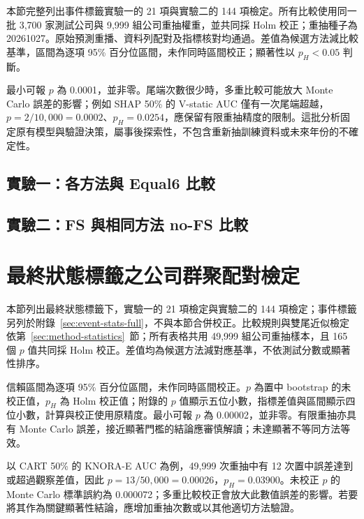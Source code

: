 本節完整列出事件標籤實驗一的 21 項與實驗二的 144 項檢定。所有比較使用同一批 3,700 家測試公司與 9,999 組公司重抽權重，並共同採 Holm 校正；重抽種子為 20261027。原始預測重播、資料列配對及指標核對均通過。差值為候選方法減比較基準，區間為逐項 95\% 百分位區間，未作同時區間校正；顯著性以 \(p_H<0.05\) 判斷。

最小可報 \(p\) 為 0.0001，並非零。尾端次數很少時，多重比較可能放大 Monte Carlo 誤差的影響；例如 SHAP 50\% 的 V-static AUC 僅有一次尾端超越，\(p=2/10{,}000=0.0002\)、\(p_H=0.0254\)，應保留有限重抽精度的限制。這批分析固定原有模型與驗證決策，屬事後探索性，不包含重新抽訓練資料或未來年份的不確定性。

\subsection*{實驗一：各方法與 Equal6 比較}


\subsection*{實驗二：FS 與相同方法 no-FS 比較}




\clearpage
\section{最終狀態標籤之公司群聚配對檢定}\label{sec:stats-full}

本節列出最終狀態標籤下，實驗一的 21 項檢定與實驗二的 144 項檢定；事件標籤另列於附錄~\ref{sec:event-stats-full}，不與本節合併校正。比較規則與雙尾近似檢定依第~\ref{sec:method-statistics}~節；所有表格共用 49,999 組公司重抽樣本，且 165 個 \(p\) 值共同採 Holm 校正。差值均為候選方法減對應基準，不依測試分數或顯著性排序。

信賴區間為逐項 95\% 百分位區間，未作同時區間校正。\(p\) 為置中 bootstrap 的未校正值，\(p_H\) 為 Holm 校正值；附錄的 \(p\) 值顯示五位小數，指標差值與區間顯示四位小數，計算與校正使用原精度。最小可報 \(p\) 為 0.00002，並非零。有限重抽亦具有 Monte Carlo 誤差，接近顯著門檻的結論應審慎解讀；未達顯著不等同方法等效。

以 CART 50\% 的 KNORA-E AUC 為例，49,999 次重抽中有 12 次置中誤差達到或超過觀察差值，因此 \(p=13/50{,}000=0.00026\)，\(p_H=0.03900\)。未校正 \(p\) 的 Monte Carlo 標準誤約為 0.000072；多重比較校正會放大此數值誤差的影響。若要將其作為關鍵顯著性結論，應增加重抽次數或以其他適切方法驗證。

